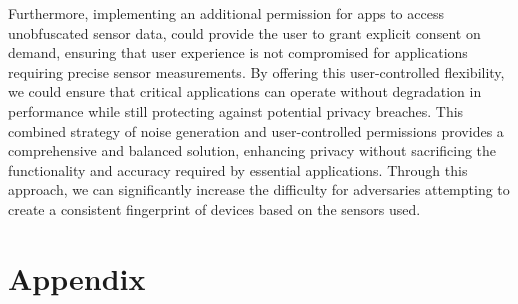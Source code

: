 \documentclass[11pt,
  oneside,openany,    %
]{scrreprt}
\begin{document}
Furthermore, implementing an additional permission for apps to access unobfuscated sensor data, could provide the user to grant explicit consent on demand, ensuring that user experience is not compromised for applications requiring precise sensor measurements.
By offering this user-controlled flexibility, we could ensure that critical applications can operate without degradation in performance while still protecting against potential privacy breaches.
This combined strategy of noise generation and user-controlled permissions provides a comprehensive and balanced solution, enhancing privacy without sacrificing the functionality and accuracy required by essential applications. 
Through this approach, we can significantly increase the difficulty for adversaries attempting to create a consistent fingerprint of devices based on the sensors used. 



\printbibliography[heading=bibintoc]

\appendix

\chapter{Appendix}
\label{chap:appendix}

\end{document}
